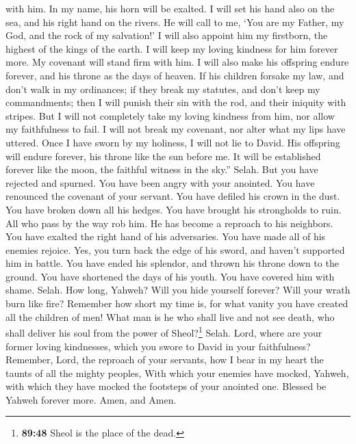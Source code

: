 with him. In my name, his horn will be exalted.  I will
set his hand also on the sea, and his right hand on the rivers.
 He will call to me, `You are my Father, my God, and the
rock of my salvation!'  I will also appoint him my
firstborn, the highest of the kings of the earth.  I will
keep my loving kindness for him forever more. My covenant will stand
firm with him.  I will also make his offspring endure
forever, and his throne as the days of heaven.  If his
children forsake my law, and don't walk in my ordinances;
 if they break my statutes, and don't keep my
commandments;  then I will punish their sin with the rod,
and their iniquity with stripes.  But I will not
completely take my loving kindness from him, nor allow my faithfulness
to fail.  I will not break my covenant, nor alter what my
lips have uttered.  Once I have sworn by my holiness, I
will not lie to David.  His offspring will endure
forever, his throne like the sun before me.  It will be
established forever like the moon, the faithful witness in the sky.''
Selah.  But you have rejected and spurned. You have been
angry with your anointed.  You have renounced the
covenant of your servant. You have defiled his crown in the dust.
 You have broken down all his hedges. You have brought
his strongholds to ruin.  All who pass by the way rob
him. He has become a reproach to his neighbors.  You have
exalted the right hand of his adversaries. You have made all of his
enemies rejoice.  Yes, you turn back the edge of his
sword, and haven't supported him in battle.  You have
ended his splendor, and thrown his throne down to the ground.
 You have shortened the days of his youth. You have
covered him with shame. Selah.  How long, Yahweh? Will
you hide yourself forever? Will your wrath burn like fire?
 Remember how short my time is, for what vanity you have
created all the children of men!  What man is he who
shall live and not see death, who shall deliver his soul from the power
of Sheol?\footnote{\textbf{89:48} Sheol is the place of the dead.}
Selah.  Lord, where are your former loving kindnesses,
which you swore to David in your faithfulness?  Remember,
Lord, the reproach of your servants, how I bear in my heart the taunts
of all the mighty peoples,  With which your enemies have
mocked, Yahweh, with which they have mocked the footsteps of your
anointed one.  Blessed be Yahweh forever more. Amen, and
Amen.

